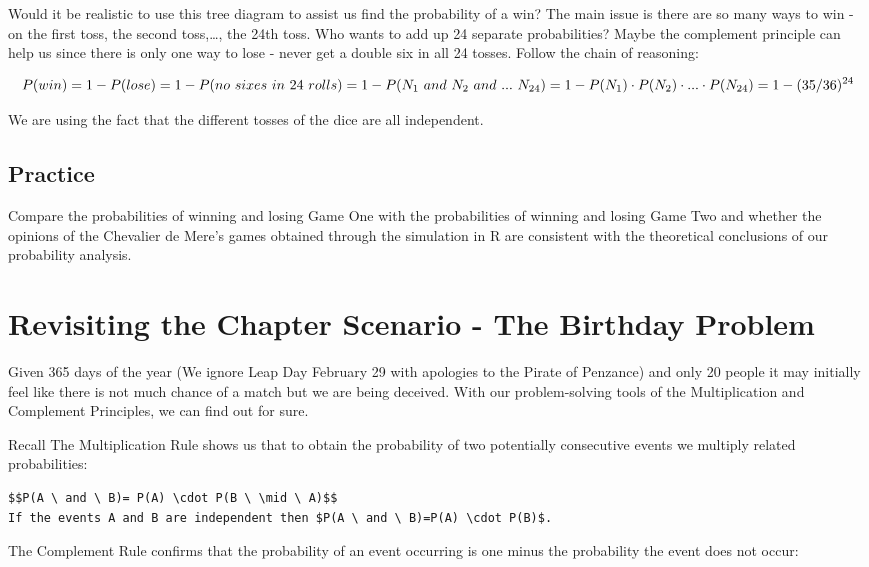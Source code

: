 \documentclass[]{book}
\theoremstyle{definition}
\theoremstyle{definition}
\theoremstyle{definition}
\theoremstyle{remark}
\begin{document}
Would it be realistic to use this tree diagram to assist us find the
probability of a win? The main issue is there are so many ways to win -
on the first toss, the second toss,\ldots{}, the 24th toss. Who wants to
add up 24 separate probabilities? Maybe the complement principle can
help us since there is only one way to lose - never get a double six in
all 24 tosses. Follow the chain of reasoning:

\[P(win) = 1 - P(lose) = 1 -P(no \ sixes \ in \ 24 \ rolls) = 1 - P(N_{1} \ and \ N_{2} \ and \ ... \ N_{24}) = \\ 1 - P(N_{1}) \cdot P(N_{2}) \cdot ... \cdot P(N_{24}) = 1 - (35/36)^{24}\]

We are using the fact that the different tosses of the dice are all
independent.

\subsection{Practice}\label{practice-3}

Compare the probabilities of winning and losing Game One with the
probabilities of winning and losing Game Two and whether the opinions of
the Chevalier de Mere's games obtained through the simulation in R are
consistent with the theoretical conclusions of our probability analysis.

\section{Revisiting the Chapter Scenario - The Birthday
Problem}\label{revisiting-the-chapter-scenario---the-birthday-problem}

Given 365 days of the year (We ignore Leap Day February 29 with
apologies to the Pirate of Penzance) and only 20 people it may initially
feel like there is not much chance of a match but we are being deceived.
With our problem-solving tools of the Multiplication and Complement
Principles, we can find out for sure.

Recall The Multiplication Rule shows us that to obtain the probability
of two potentially consecutive events we multiply related probabilities:

\begin{verbatim}
$$P(A \ and \ B)= P(A) \cdot P(B \ \mid \ A)$$
If the events A and B are independent then $P(A \ and \ B)=P(A) \cdot P(B)$.
\end{verbatim}

The Complement Rule confirms that the probability of an event occurring
is one minus the probability the event does not occur:
\end{document}
